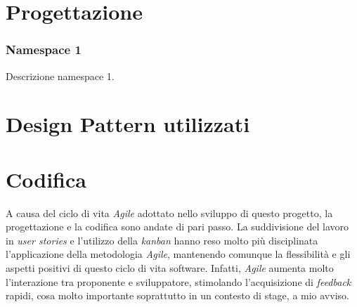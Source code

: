 \section{Progettazione}
\label{sec:progettazione}

\subsubsection{Namespace 1} %
Descrizione namespace 1.

\begin{namespacedesc}
\end{namespacedesc}


\section{Design Pattern utilizzati}

\section{Codifica}
A causa del ciclo di vita \emph{Agile} adottato nello sviluppo di questo progetto, la progettazione e la codifica sono andate di pari passo. La suddivisione del lavoro in \emph{user stories} e l'utilizzo della \emph{kanban} hanno reso molto più disciplinata l'applicazione della metodologia \emph{Agile}, mantenendo comunque la flessibilità e gli aspetti positivi di questo ciclo di vita software. Infatti, \emph{Agile} aumenta molto l'interazione tra proponente e sviluppatore, stimolando l'acquisizione di \emph{feedback} rapidi, cosa molto importante soprattutto in un contesto di stage, a mio avviso.

